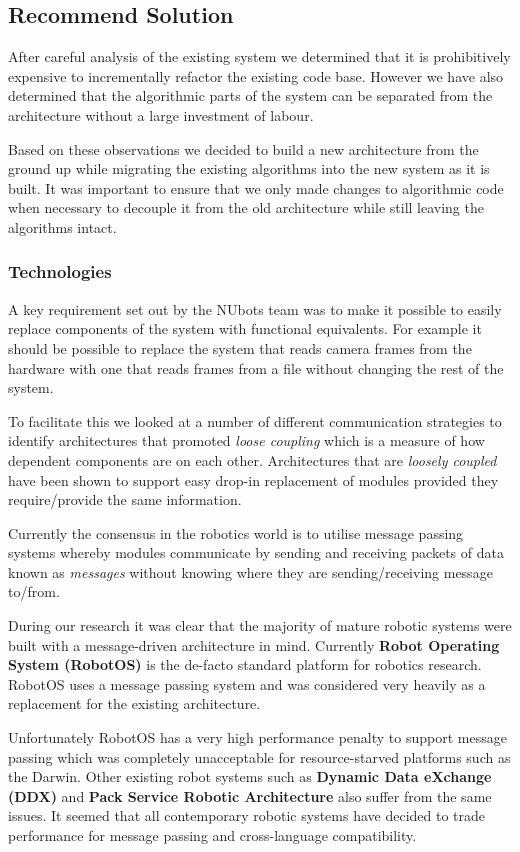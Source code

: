 \documentclass[english,12pt]{scrartcl}
\begin{document}
		\subsection{Recommend Solution}
			After careful analysis of the existing system we determined that it is prohibitively expensive to incrementally refactor the existing code base.
			However we have also determined that the algorithmic parts of the system can be separated from the architecture without a large investment of labour.

			Based on these observations we decided to build a new architecture from the ground up while migrating the existing algorithms into the new system as it is built.
			It was important to ensure that we only made changes to algorithmic code when necessary to decouple it from the old architecture while still leaving the algorithms intact.

			\subsubsection{Technologies}
				A key requirement set out by the NUbots team was to make it possible to easily replace components of the system with functional equivalents.
				For example it should be possible to replace the system that reads camera frames from the hardware with one that reads frames from a file without changing the rest of the system.

				To facilitate this we looked at a number of different communication strategies to identify architectures that promoted \emph{loose coupling} which is a measure of how dependent components are on each other.
				Architectures that are \emph{loosely coupled} have been shown to support easy drop-in replacement of modules provided they require/provide the same information.

				Currently the consensus in the robotics world is to utilise message passing systems whereby modules communicate by sending and receiving packets of data known as \emph{messages} without knowing where they are sending/receiving message to/from.

				During our research it was clear that the majority of mature robotic systems were built with a message-driven architecture in mind.
				Currently \textbf{Robot Operating System (RobotOS)} is the de-facto standard platform for robotics research.
				RobotOS uses a message passing system and was considered very heavily as a replacement for the existing architecture.

				Unfortunately RobotOS has a very high performance penalty to support message passing which was completely unacceptable for resource-starved platforms such as the Darwin.
				Other existing robot systems such as \textbf{Dynamic Data eXchange (DDX)} and \textbf{Pack Service Robotic Architecture} also suffer from the same issues. It seemed that all contemporary robotic systems have decided to trade performance for message passing and cross-language compatibility.
\end{document}
